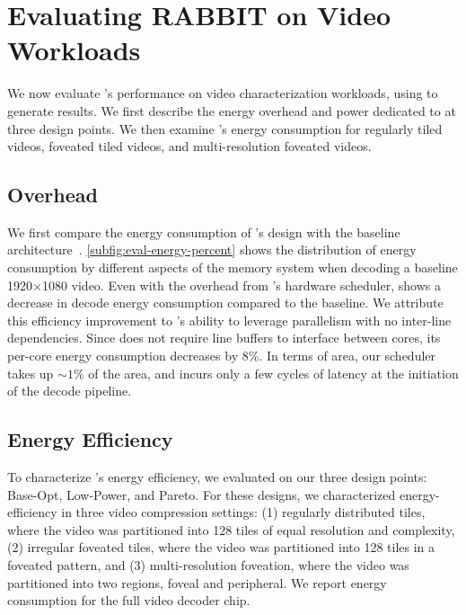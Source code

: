 
\section{Evaluating RABBIT on Video Workloads}

We now evaluate \nameArch's performance on video characterization workloads, using \nameArchprof to generate results.
We first describe the energy overhead and power dedicated to \nameArch at three design points.
We then examine \nameArch's energy consumption for regularly tiled videos, foveated tiled videos, and multi-resolution foveated videos.

\evalEnergyPower

\subsection{\nameArch Overhead}
We first compare the energy consumption of \nameArch's design with the baseline architecture~\cite{tikekar18ijssc}.
\ref{subfig:eval-energy-percent} shows the distribution of energy consumption by different aspects of the memory system when decoding a baseline 1920$\times$1080 video.
Even with the overhead from \nameArch's hardware scheduler, \nameArch shows a decrease in decode energy consumption compared to the baseline. We attribute this efficiency improvement to \nameArch's ability to leverage parallelism with no inter-line dependencies.
Since \nameArch does not require line buffers to interface between cores, its per-core energy consumption decreases by 8\%.
In terms of area, our scheduler takes up $\sim1\%$ of the area, and incurs only a few cycles of latency at the initiation of the decode pipeline.

\subsection{Energy Efficiency}
To characterize \nameArch's energy efficiency, we evaluated on our three \nameArch design points: Base-Opt, Low-Power, and Pareto. For these designs, we characterized energy-efficiency in three video compression settings: (1) regularly distributed tiles, where the video was partitioned into 128 tiles of equal resolution and complexity, (2) irregular foveated tiles, where the video was partitioned into 128 tiles in a foveated pattern, and (3) multi-resolution foveation, where the video was partitioned into two regions, foveal and peripheral. We report energy consumption for the full video decoder chip.

\evalRegularTileEnergy

